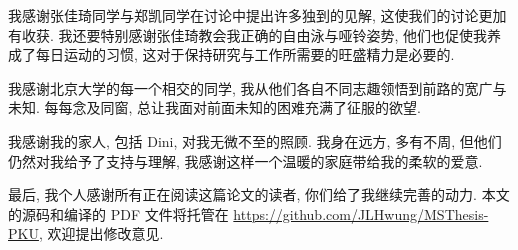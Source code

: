 我感谢张佳琦同学与郑凯同学在讨论中提出许多独到的见解, 这使我们的讨论更加有收获. 我还要特别感谢张佳琦教会我正确的自由泳与哑铃姿势, 他们也促使我养成了每日运动的习惯, 这对于保持研究与工作所需要的旺盛精力是必要的. 

我感谢北京大学的每一个相交的同学, 我从他们各自不同志趣领悟到前路的宽广与未知. 每每念及同窗, 总让我面对前面未知的困难充满了征服的欲望.

我感谢我的家人, 包括 Dini, 对我无微不至的照顾. 我身在远方, 多有不周, 但他们仍然对我给予了支持与理解, 我感谢这样一个温暖的家庭带给我的柔软的爱意. 

最后, 我个人感谢所有正在阅读这篇论文的读者, 你们给了我继续完善的动力. 本文的源码和编译的 PDF 文件将托管在 \url{https://github.com/JLHwung/MSThesis-PKU}, 欢迎提出修改意见.